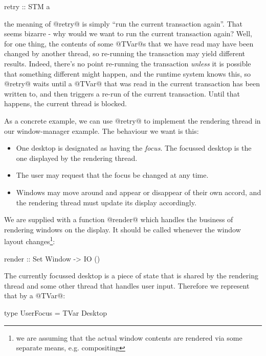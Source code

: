 \begin{haskell}
retry :: STM a
\end{haskell}

\noindent the meaning of @retry@ is simply ``run the current
transaction again''.  That seems bizarre - why would we want to run
the current transaction again?  Well, for one thing, the contents of
some @TVar@s that we have read may have been changed by another
thread, so re-running the transaction may yield different results.
Indeed, there's no point re-running the transaction \emph{unless} it
is possible that something different might happen, and the runtime
system knows this, so @retry@ waits until a @TVar@ that was read in
the current transaction has been written to, and then triggers a
re-run of the current transaction.  Until that happens, the current
thread is blocked.


As a concrete example, we can use @retry@ to implement the rendering
thread in our window-manager example.  The behaviour we want is this:

\begin{itemize}
\item One desktop is designated as having the \emph{focus}.  The
  focussed desktop is the one displayed by the rendering thread.
\item The user may request that the focus be changed at any time.
\item Windows may move around and appear or disappear of their own
  accord, and the rendering thread must update its display
  accordingly.
\end{itemize}

We are supplied with a function @render@ which handles the business of
rendering windows on the display.  It should be called whenever the
window layout changes\footnote{we are assuming that the actual window contents
are rendered via some separate means, e.g. compositing}:

\begin{haskell}
render :: Set Window -> IO ()
\end{haskell}

The currently focussed desktop is a piece of state that is shared by
the rendering thread and some other thread that handles user input.
Therefore we represent that by a @TVar@:

\begin{haskell}
type UserFocus = TVar Desktop
\end{haskell}

